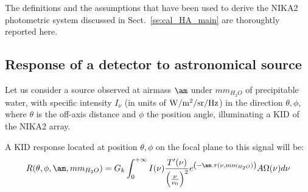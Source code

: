 

The definitions and the assumptions that have been used to derive the
NIKA2 photometric system discussed in Sect.~\ref{se:cal_HA_main} are
thoroughtly reported here.


\subsection{Response of a detector to astronomical source}


Let us consider a source observed at airmass $\am$ under
$mm_{H_{2}O}$ of precipitable water, with specific intensity $I_{\nu}$ (in units
of  ${\rm W/m^{2}/sr/Hz}$) in the direction $\theta, \phi$, where $\theta$
is the off-axis distance and $\phi$ the position angle, illuminating a KID
of the NIKA2 array. 

A KID response located at position $\theta, \phi$
on the focal plane to this signal will be:
\begin{equation}
R(\theta, \phi, \am, mm_{H_{2}O}) = G_{k} \int_{0}^{+\infty} I(\nu)
\frac{T'(\nu)}{\left(\frac{\nu}{\nu_{0}}\right)^{2}} e^{\left(-\am
  . \tau(\nu,  mm_{H_{2}O})\right)}A\Omega (\nu)  d\nu 
\label{eq:basicphot}
\end{equation}


